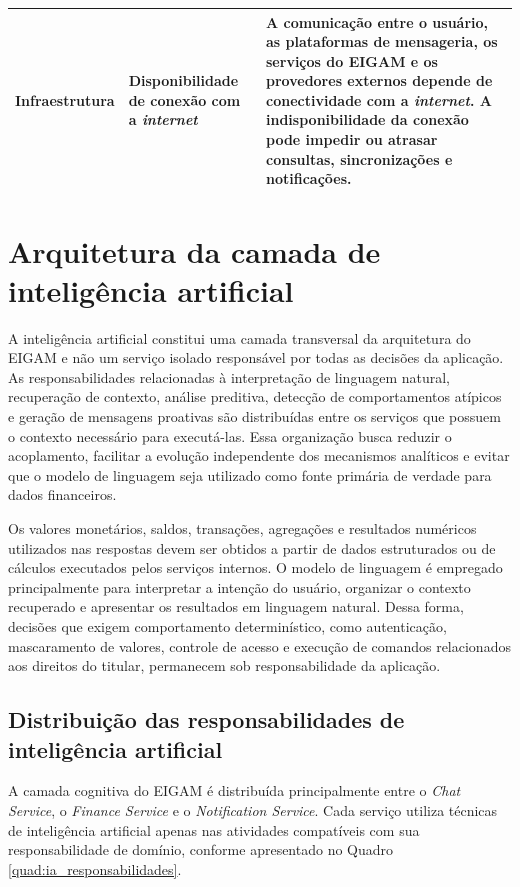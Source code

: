 {\begin{longtable}{|p{2.3cm}|p{4.0cm}|p{8.2cm}|}
Infraestrutura &
Disponibilidade de conexão com a \textit{internet} &
A comunicação entre o usuário, as plataformas de mensageria, os serviços do EIGAM e os provedores externos depende de conectividade com a \textit{internet}. A indisponibilidade da conexão pode impedir ou atrasar consultas, sincronizações e notificações.
\\ \hline

\end{longtable}
}


\section{Arquitetura da camada de inteligência artificial}

A inteligência artificial constitui uma camada transversal da arquitetura do EIGAM e não um serviço isolado responsável por todas as decisões da aplicação. As responsabilidades relacionadas à interpretação de linguagem natural, recuperação de contexto, análise preditiva, detecção de comportamentos atípicos e geração de mensagens proativas são distribuídas entre os serviços que possuem o contexto necessário para executá-las. Essa organização busca reduzir o acoplamento, facilitar a evolução independente dos mecanismos analíticos e evitar que o modelo de linguagem seja utilizado como fonte primária de verdade para dados financeiros.

Os valores monetários, saldos, transações, agregações e resultados numéricos utilizados nas respostas devem ser obtidos a partir de dados estruturados ou de cálculos executados pelos serviços internos. O modelo de linguagem é empregado principalmente para interpretar a intenção do usuário, organizar o contexto recuperado e apresentar os resultados em linguagem natural. Dessa forma, decisões que exigem comportamento determinístico, como autenticação, mascaramento de valores, controle de acesso e execução de comandos relacionados aos direitos do titular, permanecem sob responsabilidade da aplicação.

\subsection{Distribuição das responsabilidades de inteligência artificial}

A camada cognitiva do EIGAM é distribuída principalmente entre o \textit{Chat Service}, o \textit{Finance Service} e o \textit{Notification Service}. Cada serviço utiliza técnicas de inteligência artificial apenas nas atividades compatíveis com sua responsabilidade de domínio, conforme apresentado no Quadro \ref{quad:ia_responsabilidades}.

